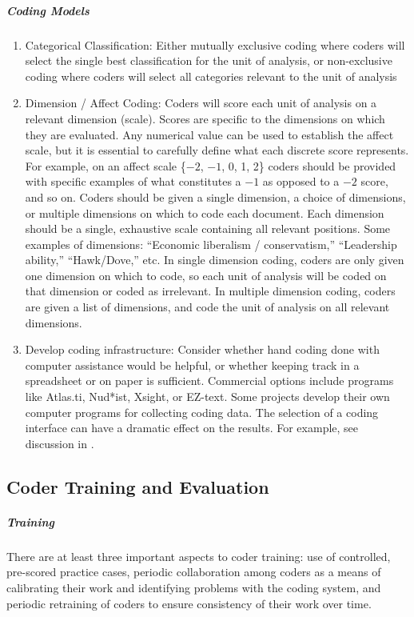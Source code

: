 \documentclass[oneside,letterpaper,titlepage]{article}
\begin{document}
\subparagraph{Coding Models}
\begin{enumerate}
\item Categorical Classification: Either mutually exclusive coding
  where coders will select the single best classification for the unit
  of analysis, or non-exclusive coding where coders will select all
  categories relevant to the unit of analysis
\item Dimension / Affect Coding: Coders will score each unit of
  analysis on a relevant dimension (scale). Scores are specific to the
  dimensions on which they are evaluated.  Any numerical value can be
  used to establish the affect scale, but it is essential to carefully
  define what each discrete score represents. For example, on an
  affect scale \{$-2$, $-1$, 0, 1, 2\} coders should be provided with
  specific examples of what constitutes a $-1$ as opposed to a $-2$
  score, and so on.  Coders should be given a single dimension, a
  choice of dimensions, or multiple dimensions on which to code each
  document.  Each dimension should be a single, exhaustive scale
  containing all relevant positions. Some examples of dimensions:
  ``Economic liberalism / conservatism,'' ``Leadership ability,''
  ``Hawk/Dove,'' etc.  In single dimension coding, coders are only
  given one dimension on which to code, so each unit of analysis will
  be coded on that dimension or coded as irrelevant. In multiple
  dimension coding, coders are given a list of dimensions, and code
  the unit of analysis on all relevant dimensions.
\item Develop coding infrastructure: Consider whether hand coding done
  with computer assistance would be helpful, or whether keeping track
  in a spreadsheet or on paper is sufficient. Commercial options
  include programs like Atlas.ti, Nud*ist, Xsight, or EZ-text. Some
  projects develop their own computer programs for collecting coding
  data. The selection of a coding interface can have a dramatic effect
  on the results. For example, see discussion in \cite{KwoShuHov06}.
\end{enumerate}

\subsection{Coder Training and Evaluation}

\subparagraph{Training} There are at least three important aspects to
coder training: use of controlled, pre-scored practice cases, periodic
collaboration among coders as a means of calibrating their work and
identifying problems with the coding system, and periodic retraining
of coders to ensure consistency of their work over time.
\end{document}
